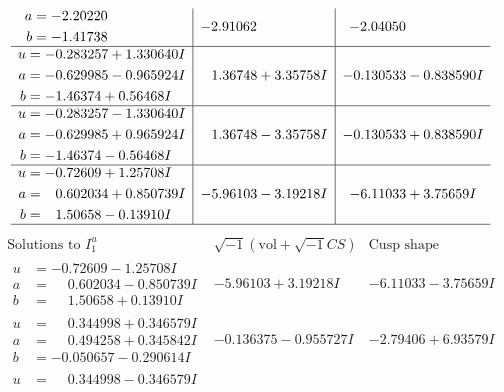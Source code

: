 \documentclass[1p]{elsarticle_modified}
\theoremstyle{definition}
\newcommand{\I}{\sqrt{-1}}
\begin{document}
$$\begin{array}{c|c|c}
\begin{aligned}
a &= -2.20220\phantom{ +0.000000I} \\
b &= -1.41738\phantom{ +0.000000I}\end{aligned}
 & -2.91062\phantom{ +0.000000I} & -2.04050\phantom{ +0.000000I} \\ \hline\begin{aligned}
u &= -0.283257 + 1.330640 I \\
a &= -0.629985 - 0.965924 I \\
b &= -1.46374 + 0.56468 I\end{aligned}
 & \phantom{-}1.36748 + 3.35758 I & -0.130533 - 0.838590 I \\ \hline\begin{aligned}
u &= -0.283257 - 1.330640 I \\
a &= -0.629985 + 0.965924 I \\
b &= -1.46374 - 0.56468 I\end{aligned}
 & \phantom{-}1.36748 - 3.35758 I & -0.130533 + 0.838590 I \\ \hline\begin{aligned}
u &= -0.72609 + 1.25708 I \\
a &= \phantom{-}0.602034 + 0.850739 I \\
b &= \phantom{-}1.50658 - 0.13910 I\end{aligned}
 & -5.96103 - 3.19218 I & -6.11033 + 3.75659 I\\
 \hline 
 \end{array}$$\newpage$$\begin{array}{c|c|c}  
\text{Solutions to }I^u_{1}& \I (\text{vol} + \sqrt{-1}CS) & \text{Cusp shape}\\
 \hline 
\begin{aligned}
u &= -0.72609 - 1.25708 I \\
a &= \phantom{-}0.602034 - 0.850739 I \\
b &= \phantom{-}1.50658 + 0.13910 I\end{aligned}
 & -5.96103 + 3.19218 I & -6.11033 - 3.75659 I \\ \hline\begin{aligned}
u &= \phantom{-}0.344998 + 0.346579 I \\
a &= \phantom{-}0.494258 + 0.345842 I \\
b &= -0.050657 - 0.290614 I\end{aligned}
 & -0.136375 - 0.955727 I & -2.79406 + 6.93579 I \\ \hline\begin{aligned}
u &= \phantom{-}0.344998 - 0.346579 I \\

\end{aligned}
\end{array}$$
\end{document}
